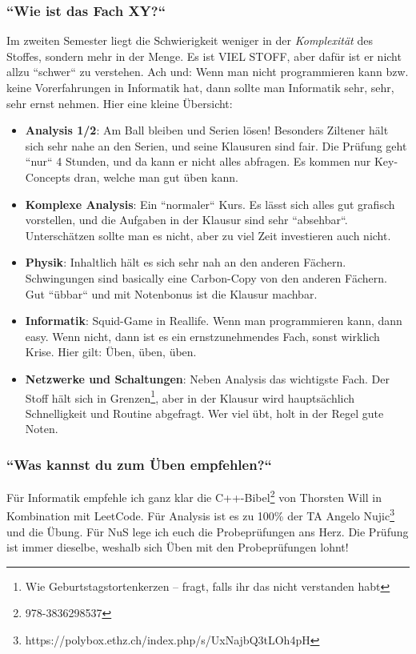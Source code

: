 \documentclass[11pt,a4paper]{article}
\begin{document}
\subsubsection{``Wie ist das Fach XY{?}``}
Im zweiten Semester liegt die Schwierigkeit weniger in der \textit{Komplexität} des Stoffes, sondern mehr in der Menge. Es ist VIEL STOFF, aber dafür ist er nicht allzu ``schwer`` zu verstehen. Ach und: Wenn man nicht programmieren kann bzw. keine Vorerfahrungen in Informatik hat, dann sollte man Informatik sehr, sehr, sehr ernst nehmen. Hier eine kleine Übersicht:

\begin{itemize}
    \item \textbf{Analysis 1/2}: Am Ball bleiben und Serien lösen! Besonders Ziltener hält sich sehr nahe an den Serien, und seine Klausuren sind fair. Die Prüfung geht ``nur`` 4 Stunden, und da kann er nicht alles abfragen. Es kommen nur Key-Concepts dran, welche man gut üben kann.
    \item \textbf{Komplexe Analysis}: Ein ``normaler`` Kurs. Es lässt sich alles gut grafisch vorstellen, und die Aufgaben in der Klausur sind sehr ``absehbar``. Unterschätzen sollte man es nicht, aber zu viel Zeit investieren auch nicht.
    \item \textbf{Physik}: Inhaltlich hält es sich sehr nah an den anderen Fächern. Schwingungen sind basically eine Carbon-Copy von den anderen Fächern. Gut ``übbar`` und mit Notenbonus ist die Klausur machbar.
    \item \textbf{Informatik}: Squid-Game in Reallife. Wenn man programmieren kann, dann easy. Wenn nicht, dann ist es ein ernstzunehmendes Fach, sonst wirklich Krise. Hier gilt: Üben, üben, üben.
    \item \textbf{Netzwerke und Schaltungen}: Neben Analysis das wichtigste Fach. Der Stoff hält sich in Grenzen\footnote{Wie Geburtstagstortenkerzen – fragt, falls ihr das nicht verstanden habt}, aber in der Klausur wird hauptsächlich Schnelligkeit und Routine abgefragt. Wer viel übt, holt in der Regel gute Noten.
\end{itemize}

\subsubsection{``Was kannst du zum Üben empfehlen{?}``}
Für Informatik empfehle ich ganz klar die C++-Bibel\footnote{978-3836298537} von Thorsten Will in Kombination mit LeetCode. Für Analysis ist es zu 100\% der TA Angelo Nujic\footnote{https://polybox.ethz.ch/index.php/s/UxNajbQ3tLOh4pH} und die Übung. Für NuS lege ich euch die Probeprüfungen ans Herz. Die Prüfung ist immer dieselbe, weshalb sich Üben mit den Probeprüfungen lohnt!
\end{document}
